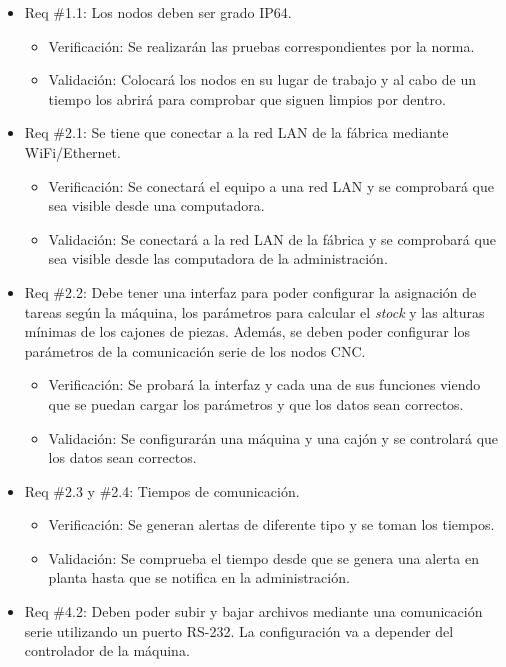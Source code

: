 \documentclass[11pt]{charter}
\begin{document}
\begin{itemize}
    \item Req \#1.1: Los nodos deben ser grado IP64.
    \begin{itemize}
        \item Verificación: Se realizarán las pruebas correspondientes por la norma. 
        \item Validación: Colocará los nodos en su lugar de trabajo y al cabo de un tiempo los abrirá para comprobar que siguen limpios por dentro. 
    \end{itemize}
    \item Req \#2.1:  Se tiene que conectar a la red LAN de la fábrica mediante WiFi/Ethernet.
    \begin{itemize}
        \item Verificación: Se conectará el equipo a una red LAN y se comprobará que sea visible desde una computadora. 
        \item Validación: Se conectará a la red LAN de la fábrica y se comprobará que sea visible desde las computadora de la administración.
    \end{itemize}
    \item Req \#2.2: Debe tener una interfaz para poder configurar la asignación de tareas según la máquina, los parámetros para calcular el \textit{stock} y las alturas mínimas de los cajones de piezas. Además, se deben poder configurar los parámetros de la comunicación serie de los nodos CNC.
    \begin{itemize}
        \item Verificación: Se probará la interfaz y cada una de sus funciones viendo que se puedan cargar los parámetros y que los datos sean correctos.
        \item Validación: Se configurarán una máquina y una cajón y se controlará  que los datos sean correctos.
    \end{itemize}
    \item Req \#2.3 y \#2.4: Tiempos de comunicación.
    \begin{itemize}
        \item Verificación: Se generan alertas de diferente tipo y se toman los tiempos.
        \item Validación: Se comprueba el tiempo desde que se genera una alerta en planta hasta que se notifica en la administración. 
    \end{itemize}
    \item Req \#4.2: Deben poder subir y bajar archivos mediante una comunicación serie utilizando un puerto RS-232. La configuración va a depender del controlador de la máquina.

\end{itemize}
\end{document}

